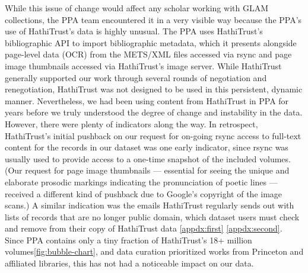 \documentclass{anthology-ch}         %
\begin{document}
While this issue of change would affect any scholar working with GLAM collections, the PPA team encountered it in a very visible way because the PPA’s use of HathiTrust’s data is highly unusual. The PPA uses HathiTrust’s bibliographic API to import bibliographic metadata, which it presents alongside page-level data (OCR) from the METS/XML files accessed via rsync and page image thumbnails accessed via HathiTrust’s image server. While HathiTrust generally supported our work through several rounds of negotiation and renegotiation, HathiTrust was not designed to be used in this persistent, dynamic manner. Nevertheless, we had been using content from HathiTrust in PPA for years before we truly understood the degree of change and instability in the data. However, there were plenty of indicators along the way. In retrospect, HathiTrust’s initial pushback on our request for on-going rsync access to full-text content for the records in our dataset was one early indicator, since rsync was usually used to provide access to a one-time snapshot of the included volumes. (Our request for page image thumbnails — essential for seeing the unique and elaborate prosodic markings indicating the pronunciation of poetic lines — received a different kind of pushback due to Google’s copyright of the image scans.) A similar indication was the emails HathiTrust regularly sends out with lists of records that are no longer public domain, which dataset users must check and remove from their copy of HathiTrust data \ref{appdx:first} \ref{appdx:second}. Since PPA contains only a tiny fraction of HathiTrust’s 18+ million volumes\ref{fig:bubble-chart}, and data curation prioritized works from Princeton and affiliated libraries, this has not had a noticeable impact on our data.
\end{document}
